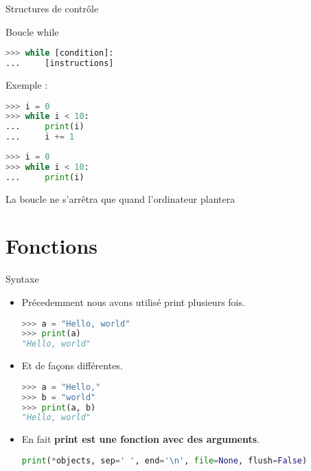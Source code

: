 \begin{frame}[fragile]{Structures de contrôle}
  \begin{block}{Boucle while}
  \medskip  
\begin{lstlisting}[language=Python, morekeywords={True, false}, numbers=none]
>>> while [condition]:
...     [instructions]
\end{lstlisting}
  \end{block}

    Exemple :
    \begin{overprint}
    
\begin{lstlisting}[language=Python, morekeywords={True, false}, numbers=none]
>>> i = 0
>>> while i < 10:
...     print(i)
...     i += 1
\end{lstlisting}

\begin{lstlisting}[language=Python, morekeywords={True, false}, numbers=none]
>>> i = 0
>>> while i < 10:
...     print(i)
\end{lstlisting}
La boucle ne s'arrêtra que quand l'ordinateur plantera

\end{overprint}
\end{frame}


\section{Fonctions}

\begin{frame}[fragile]{Syntaxe}

  \begin{itemize}
    \item<+->[\textcolor{white}{a}]Précedemment nous avons utilisé print plusieurs fois.
\begin{lstlisting}[language=Python, morekeywords={as, TypeError}, numbers=none]
>>> a = "Hello, world"
>>> print(a)
"Hello, world"
\end{lstlisting}
    \item<+->[\textcolor{white}{a}]Et de façons différentes.
\begin{lstlisting}[language=Python, morekeywords={as, TypeError}, numbers=none]
>>> a = "Hello,"
>>> b = "world"
>>> print(a, b)
"Hello, world"
\end{lstlisting}
    \item<+->[\textcolor{white}{a}]En fait \textbf{print est une fonction avec des arguments}.
\begin{lstlisting}[language=Python, morekeywords={as, TypeError}, numbers=none]
print(*objects, sep=' ', end='\n', file=None, flush=False)
\end{lstlisting}
  \end{itemize}

\end{frame}


